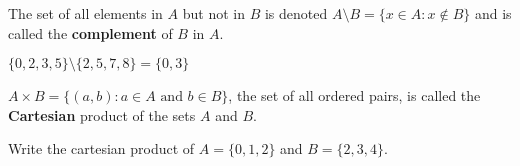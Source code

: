 \documentclass[calc1-main.tex]{subfiles}
\begin{document}
The set of all elements in $A$ but not in $B$ is denoted $A\setminus B=\{x\in A:x\notin B\}$ and is called the \textbf{complement} of $B$ in $A.$

\begin{example}
$\{0,2,3,5\}\setminus \{2,5,7,8\}=\{0,3\}$
\end{example}

$A\times B=\{(a,b):a\in A \text{ and } b\in B\}$, the set of all ordered pairs, is called the \textbf{Cartesian} product of the sets $A$ and $B$.

\begin{example}
Write the cartesian product of $A=\{0,1,2\}$ and $B=\{2,3,4\}$.
\end{example}
\end{document}
